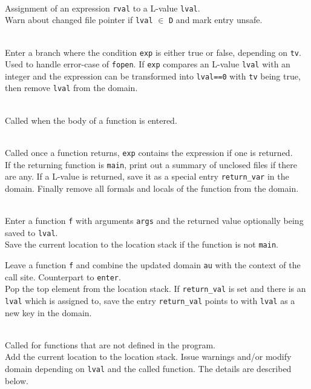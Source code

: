 \begin{description}
\item {}\\
Assignment of an expression \verb|rval| to a L-value \verb|lval|.\\
Warn about changed file pointer if \verb|lval| $\in$ \verb|D| and mark entry unsafe. %

\item {}\\
Enter a branch where the condition \verb|exp| is either true or false, depending on \verb|tv|.\\
Used to handle error-case of \verb|fopen|. If \verb|exp| compares an L-value \verb|lval| with an integer and the expression can be transformed into \verb|lval==0| with \verb|tv| being true, then remove \verb|lval| from the domain.

\item {}\\
Called when the body of a function is entered.

\item {}\\
Called once a function returns, \verb|exp| contains the expression if one is returned.\\
If the returning function is \verb|main|, print out a summary of unclosed files if there are any.
If a L-value is returned, save it as a special entry \verb|return_var| in the domain.
Finally remove all formals and locals of the function from the domain.

\item {}\\
Enter a function \verb|f| with arguments \verb|args| and the returned value optionally being saved to \verb|lval|.\\
Save the current location to the location stack if the function is not \verb|main|.

\item {}Leave a function \verb|f| and combine the updated domain \verb|au| with the context of the call site. Counterpart to \verb|enter|.\\
Pop the top element from the location stack. If \verb|return_val| is set and there is an \verb|lval| which is assigned to, save the entry \verb|return_val| points to with \verb|lval| as a new key in the domain.


\item {}\\
Called for functions that are not defined in the program.\\
Add the current location to the location stack. Issue warnings and/or modify domain depending on \verb|lval| and the called function. The details are described below.
\end{description}



